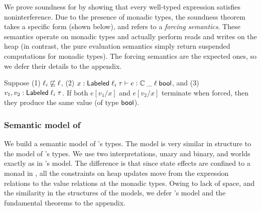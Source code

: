 


We prove soundness for {\cg} by showing that every well-typed
expression satisfies noninterference. Due to the presence of monadic
types, the soundness theorem takes a specific form (shown below), and
refers to a \emph{forcing semantics}. These semantics operate on
monadic types and actually perform reads and writes on the heap (in
contrast, the pure evaluation semantics simply return suspended
computations for monadic types). The forcing semantics are the
expected ones, so we defer their details to the appendix.

\begin{thm}
  \label{thm:ni-cg}
  Suppose (1) $\ell_i \not\sqsubseteq \ell$, (2)
  $x: \mathsf{Labeled}\;\ell_i\;\tau \vdash e: \mathbb{C}\;\_\;\ell\;\mathsf{bool}$, and (3)
  $v_1, v_2: \mathsf{Labeled}\;\ell_i\;\tau$. If both $e[v_1/x]$ and $e[v_2/x]$ terminate when forced,
  then they produce the same value (of type $\mathsf{bool}$).
\end{thm}

\subsubsection{Semantic model of {\cg}}
%
We build a semantic model of {\cg}'s types. The model is very similar
in structure to the model of {\fg}'s types. We use two
interpretations, unary and binary, and worlds exactly as in {\fg}'s
model. The difference is that since state effects are confined to a
monad in {\cg}, all the constraints on heap updates move from the
expression relations to the value relations at the monadic
types. Owing to lack of space, and the similarity in the structures of
the models, we defer {\cg}'s model and the fundamental theorems to the
appendix.

